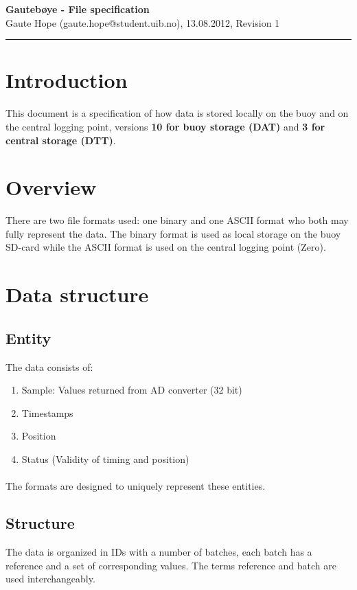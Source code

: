 \documentclass[a4paper]{article}
\newcommand{\makeheading}[2]%
        {\hspace*{-\marginparsep minus \marginparwidth}%
         \begin{minipage}[t]{\textwidth\marginparwidth\marginparsep}%
           {\large \bfseries #1}\\{#2}\\[-0.15\baselineskip]%
                 \rule{\columnwidth}{1pt}%
         \end{minipage}}
\begin{document}
\makeheading{Gautebøye - File specification}{Gaute Hope
(gaute.hope@student.uib.no), 13.08.2012, Revision 1}

\vspace{2em}
\section*{Introduction}
This document is a specification of how data is stored locally on the
buoy and on the central logging point, versions \textbf{10 for buoy
storage (DAT)} and \textbf{3 for central storage (DTT)}.

\vspace{2em}

\begin{multicols}{2}
  \section{Overview}
  There are two file formats used: one binary
  and one ASCII format who both may fully represent the data.
  The binary format is used as local storage on the
  buoy SD-card while the ASCII format is used on the central logging point
  (Zero).

  \section{Data structure}
    \subsection{Entity}
    The data consists of:
    \begin{enumerate}
      \item Sample: Values returned from AD converter (32 bit)
      \item Timestamps
      \item Position
      \item Status (Validity of timing and position)
    \end{enumerate}

    \paragraph{} The formats are designed to uniquely represent these
    entities.

    \subsection{Structure}
    The data is organized in IDs with a number of batches, each batch
    has a reference and a set of corresponding values. The terms reference and
    batch are used interchangeably.


\end{multicols}
\end{document}
